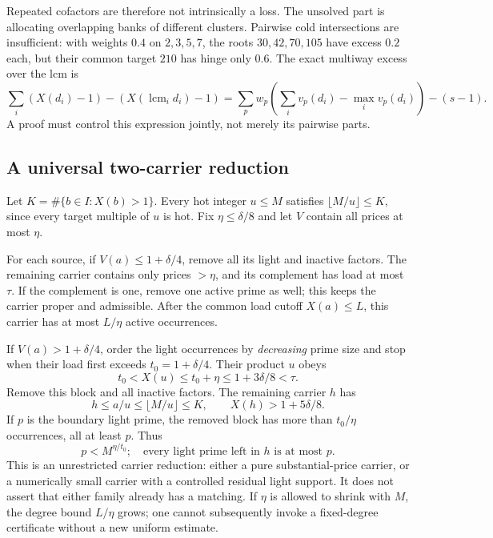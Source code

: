 \documentclass[11pt,a4paper]{article}
\begin{document}
Repeated cofactors are therefore not intrinsically a loss. The unsolved
part is allocating overlapping banks of different clusters. Pairwise cold
intersections are insufficient: with weights $0.4$ on $2,3,5,7$, the roots
$30,42,70,105$ have excess $0.2$ each, but their common target $210$ has
hinge only $0.6$. The exact multiway excess over the lcm is
\[
 \sum_i(X(d_i)-1)-(X(\operatorname{lcm}_i d_i)-1)
 =\sum_p w_p\left(\sum_i v_p(d_i)-\max_i v_p(d_i)\right)-(s-1).
\]
A proof must control this expression jointly, not merely its pairwise parts.

\subsection{A universal two-carrier reduction}

Let $K=\#\{b\in I:X(b)>1\}$. Every hot integer $u\le M$ satisfies
$\lfloor M/u\rfloor\le K$, since every target multiple of $u$ is hot.
Fix $\eta\le\delta/8$ and let $V$ contain all prices at most $\eta$.

For each source, if $V(a)\le1+\delta/4$, remove all its light and inactive
factors. The remaining carrier contains only prices $>\eta$, and its
complement has load at most $\tau$. If the complement is one, remove one
active prime as well; this keeps the carrier proper and admissible.
After the common load cutoff $X(a)\le L$, this carrier has at most $L/\eta$
active occurrences.

If $V(a)>1+\delta/4$, order the light occurrences by \emph{decreasing} prime
size and stop when their load first exceeds $t_0=1+\delta/4$. Their product
$u$ obeys
\[
 t_0<X(u)\le t_0+\eta\le1+3\delta/8<\tau.
\]
Remove this block and all inactive factors. The remaining carrier $h$ has
\begin{equation}
 h\le a/u\le\lfloor M/u\rfloor\le K,
 \qquad X(h)>1+5\delta/8.                               \label{dichotomy}
\end{equation}
If $p$ is the boundary light prime, the removed block has more than
$t_0/\eta$ occurrences, all at least $p$. Thus
\begin{equation}
 p<M^{\eta/t_0};
 \quad\text{every light prime left in }h\text{ is at most }p.
 \label{reverse}
\end{equation}
This is an unrestricted carrier reduction: either a pure substantial-price
carrier, or a numerically small carrier with a controlled residual light
support. It does not assert that either family already has a matching.
If $\eta$ is allowed to shrink with $M$, the degree bound $L/\eta$ grows;
one cannot subsequently invoke a fixed-degree certificate without a new
uniform estimate.
\end{document}
